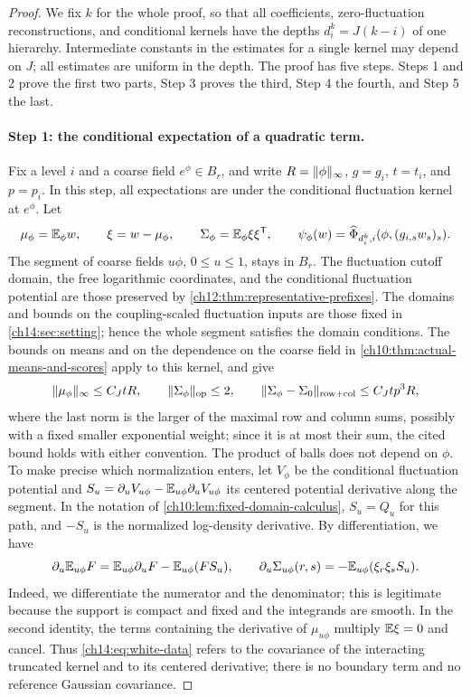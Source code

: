 \begin{proof}
We fix $k$ for the whole proof, so that all coefficients, zero-fluctuation reconstructions, and conditional kernels have the depths $d_i^k=J(k-i)$ of one hierarchy. Intermediate constants in the estimates for a single kernel may depend on $J$; all estimates are uniform in the depth. The proof has five steps. Steps 1 and 2 prove the first two parts, Step 3 proves the third, Step 4 the fourth, and Step 5 the last.

\paragraph{Step 1: the conditional expectation of a quadratic term.}
Fix a level $i$ and a coarse field $e^\phi\in B_r$, and write $R=\lVert \phi\rVert_\infty$, $g=g_i$, $t=t_i$, and $p=p_i$. In this step, all expectations are under the conditional fluctuation kernel at $e^\phi$. Let
\[
 \mu_\phi=\mathbb E_\phi w,\qquad\xi=w-\mu_\phi,\qquad\Sigma_\phi=\mathbb E_\phi\xi\xi^{\mathsf T},\qquad\psi_\phi(w)=\widehat\Phi_{d_i^k,i}(\phi,(g_{i,s}w_s)_s).
\]
The segment of coarse fields $u\phi$, $0\le u\le1$, stays in $B_r$. The fluctuation cutoff domain, the free logarithmic coordinates, and the conditional fluctuation potential are those preserved by \cref{ch12:thm:representative-prefixes}. The domains and bounds on the coupling-scaled fluctuation inputs are those fixed in \cref{ch14:sec:setting}; hence the whole segment satisfies the domain conditions. The bounds on means and on the dependence on the coarse field in \cref{ch10:thm:actual-means-and-scores} apply to this kernel, and give
\begin{equation}\label{ch14:eq:white-data}
 \lVert \mu_\phi\rVert_\infty\le C_JtR,\qquad\lVert \Sigma_\phi\rVert_{\mathrm{op}}\le2,\qquad\lVert \Sigma_\phi-\Sigma_0\rVert_{\mathrm{row+col}}\le C_Jtp^3R,
\end{equation}
where the last norm is the larger of the maximal row and column sums, possibly with a fixed smaller exponential weight; since it is at most their sum, the cited bound holds with either convention. The product of balls does not depend on $\phi$. To make precise which normalization enters, let $V_\phi$ be the conditional fluctuation potential and $S_u=\partial_uV_{u\phi}-\mathbb E_{u\phi}\partial_uV_{u\phi}$ its centered potential derivative along the segment. In the notation of \cref{ch10:lem:fixed-domain-calculus}, $S_u=Q_u$ for this path, and $-S_u$ is the normalized log-density derivative. By differentiation, we have
\begin{equation}\label{ch14:eq:score-identity}
 \partial_u\mathbb E_{u\phi}F=\mathbb E_{u\phi}\partial_uF-\mathbb E_{u\phi}(FS_u),\qquad\partial_u\Sigma_{u\phi}(r,s)=-\mathbb E_{u\phi}(\xi_r\xi_sS_u).
\end{equation}
Indeed, we differentiate the numerator and the denominator; this is legitimate because the support is compact and fixed and the integrands are smooth. In the second identity, the terms containing the derivative of $\mu_{u\phi}$ multiply $\mathbb E\xi=0$ and cancel. Thus \eqref{ch14:eq:white-data} refers to the covariance of the interacting truncated kernel and to its centered derivative; there is no boundary term and no reference Gaussian covariance.


\end{proof}
